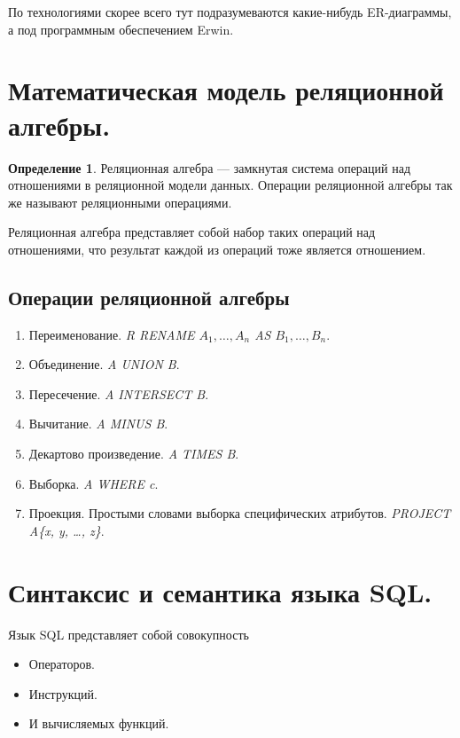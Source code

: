 \documentclass[12pt]{report}
\theoremstyle{definition}
\newtheorem{definition}[theorem]{Определение}
\begin{document}
По технологиями скорее всего тут подразумеваются какие-нибудь ER-диаграммы,
а под программным обеспечением Erwin.


\section{Математическая модель реляционной алгебры.}
\begin{definition}
Реляционная алгебра --- замкнутая система операций над отношениями в реляционной
модели данных. Операции реляционной алгебры так же называют реляционными операциями.
\end{definition}

Реляционная алгебра представляет собой набор таких операций над отношениями,
что результат каждой из операций тоже является отношением.

\subsection{Операции реляционной алгебры}
\begin{enumerate}
\item Переименование.
  {\it R RENAME $A_1, \dots, A_n$ AS $B_1, \dots, B_n$}.
\item Объединение.
  {\it A UNION B}.
\item Пересечение.
  {\it A INTERSECT B}.
\item Вычитание.
  {\it A MINUS B}.
\item Декартово произведение.
  {\it A TIMES B}.
\item Выборка.
  {\it A WHERE c}.
\item Проекция. Простыми словами выборка специфических атрибутов.
  {\it PROJECT A\{x, y, \dots, z\}}.
\end{enumerate}


\section{Синтаксис и семантика языка SQL.}

Язык SQL представляет собой совокупность
\begin{itemize}
\item Операторов.
\item Инструкций.
\item И вычисляемых функций.
\end{itemize}
\end{document}
